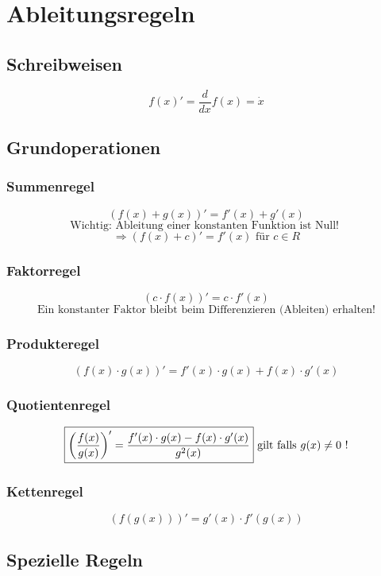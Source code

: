 \section{Ableitungsregeln}

\subsection{Schreibweisen}
\[ \boxed{f(x)' = \frac{d}{dx} f(x) = \dot{x}} \]

\subsection{Grundoperationen}

\subsubsection{Summenregel}
\[ \boxed{ (f(x) + g(x))' = f'(x) + g'(x) } \]
\[ \text{Wichtig: Ableitung einer konstanten Funktion ist Null! } \]
\[ \Rightarrow (f(x) + c)' = f'(x) \text{ für } c \in R \]

\subsubsection{Faktorregel}
\[ \boxed{ (c \cdot f(x))' = c \cdot f'(x) } \]
\[ \text{Ein konstanter Faktor bleibt beim Differenzieren (Ableiten) erhalten!} \]

\subsubsection{Produkteregel}
\[ \boxed{ (f(x) \cdot g(x))' = f'(x) \cdot g(x) + f(x) \cdot g'(x) } \]

\subsubsection{Quotientenregel}
\[ \boxed{ \left( \frac{f(x)}{g(x)} \right)' = \frac{ f'(x) \cdot g(x) - f(x) \cdot g'(x) }{ g^2(x) } } \\ \text{ gilt falls }g(x) \neq 0 \text{ !} \]

\subsubsection{Kettenregel}
\[ \boxed{ (f(g(x)))' = g'(x) \cdot f'(g(x)) } \]

\newpage

\subsection{Spezielle Regeln}


